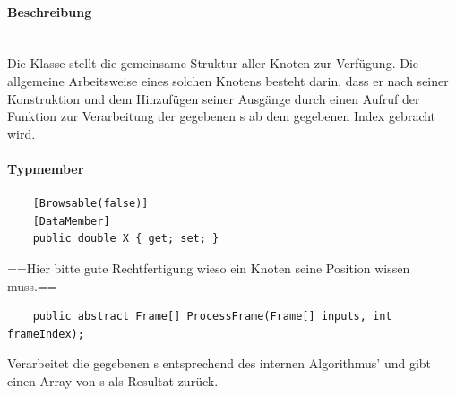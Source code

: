 \paragraph{Beschreibung}~\\
Die Klasse  stellt die gemeinsame Struktur aller Knoten zur Verfügung. Die allgemeine Arbeitsweise eines solchen Knotens besteht darin, dass er nach seiner Konstruktion und dem Hinzufügen seiner Ausgänge durch einen Aufruf der Funktion  zur Verarbeitung der gegebenen s ab dem gegebenen Index gebracht wird.

\paragraph{Typmember}
\begin{itemize}

	\begin{verbatim}
	[Browsable(false)]
	[DataMember]
	public double X { get; set; }
	\end{verbatim}
	==Hier bitte gute Rechtfertigung wieso ein Knoten seine Position wissen muss.==


	\begin{verbatim}
	public abstract Frame[] ProcessFrame(Frame[] inputs, int frameIndex);
	\end{verbatim}
	Verarbeitet die gegebenen s entsprechend des internen Algorithmus' und gibt einen Array von s als Resultat zurück.


\end{itemize}



